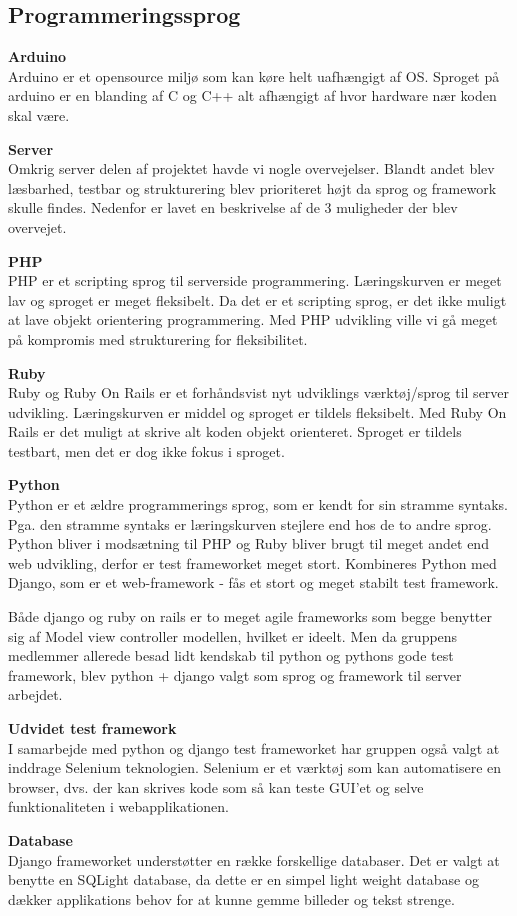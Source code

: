 \subsection*{Programmeringssprog}

\textbf{{\LARGE Arduino}} \\
Arduino er et opensource miljø som kan køre helt uafhængigt af OS. Sproget på arduino er en blanding af C og C++ alt afhængigt af hvor hardware nær koden skal være. \newline

\textbf{{\LARGE Server}} \\
Omkrig server delen af projektet havde vi nogle overvejelser. Blandt andet blev læsbarhed, testbar og strukturering blev prioriteret højt da sprog og framework skulle findes. Nedenfor er lavet en beskrivelse af de 3 muligheder der blev overvejet. \newline

\textbf{PHP}\\
PHP er et scripting sprog til serverside programmering. Læringskurven er meget lav og sproget er meget fleksibelt. Da det er et scripting sprog, er det ikke muligt at lave objekt orientering programmering. Med PHP udvikling ville vi gå meget på kompromis med strukturering for fleksibilitet. 

\textbf{Ruby} \\
Ruby og Ruby On Rails er et forhåndsvist nyt udviklings værktøj/sprog til server udvikling. Læringskurven er middel og sproget er tildels fleksibelt. Med Ruby On Rails er det muligt at skrive alt koden objekt orienteret. Sproget er tildels testbart, men det er dog ikke fokus i sproget. 

\textbf{Python} \\
Python er et ældre programmerings sprog, som er kendt for sin stramme syntaks. Pga. den stramme syntaks er læringskurven stejlere end hos de to andre sprog.
Python bliver i modsætning til PHP og Ruby bliver brugt til meget andet end web udvikling, derfor er test frameworket meget stort. Kombineres Python med Django, som er et web-framework - fås et stort og meget stabilt test framework. \newline

Både django og ruby on rails er to meget agile frameworks som begge benytter sig af Model view controller modellen, hvilket er ideelt. Men da gruppens medlemmer allerede besad lidt kendskab til python og pythons gode test framework, blev python + django valgt som sprog og framework til server arbejdet.

\newpage

\textbf{Udvidet test framework} \\
I samarbejde med python og django test frameworket har gruppen også valgt at inddrage Selenium teknologien. Selenium er et værktøj som kan automatisere en browser, dvs. der kan skrives kode som så kan teste GUI'et og selve funktionaliteten i webapplikationen. 

\textbf{Database}\\
Django frameworket understøtter en række forskellige databaser. Det er valgt at benytte en SQLight database, da dette er en simpel light weight database og dækker applikations behov for at kunne gemme billeder og tekst strenge. 
